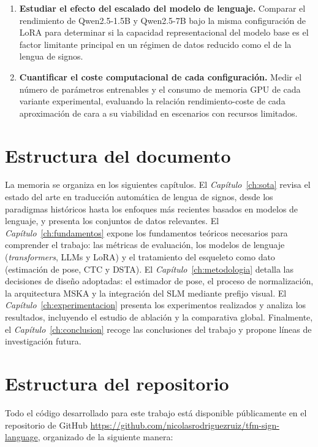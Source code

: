 \begin{enumerate}
    \item \textbf{Estudiar el efecto del escalado del modelo de lenguaje.}
    Comparar el rendimiento de Qwen2.5-1.5B y Qwen2.5-7B bajo la misma configuración de LoRA para determinar si la capacidad representacional del modelo base es el factor limitante principal en un régimen de datos reducido como el de la lengua de signos.

    \item \textbf{Cuantificar el coste computacional de cada configuración.}
    Medir el número de parámetros entrenables y el consumo de memoria GPU de cada variante experimental, evaluando la relación rendimiento-coste de cada aproximación de cara a su viabilidad en escenarios con recursos limitados.

\end{enumerate}

\section{Estructura del documento}

La memoria se organiza en los siguientes capítulos.
El \textit{Capítulo}~\ref{ch:sota} revisa el estado del arte en traducción automática de lengua de signos, desde los paradigmas históricos hasta los enfoques más recientes basados en modelos de lenguaje, y presenta los conjuntos de datos relevantes.
El \textit{Capítulo}~\ref{ch:fundamentos} expone los fundamentos teóricos necesarios para comprender el trabajo: las métricas de evaluación, los modelos de lenguaje (\textit{transformers}, LLMs y LoRA) y el tratamiento del esqueleto como dato (estimación de pose, CTC y DSTA).
El \textit{Capítulo}~\ref{ch:metodologia} detalla las decisiones de diseño adoptadas: el estimador de pose, el proceso de normalización, la arquitectura MSKA y la integración del SLM mediante prefijo visual.
El \textit{Capítulo}~\ref{ch:experimentacion} presenta los experimentos realizados y analiza los resultados, incluyendo el estudio de ablación y la comparativa global.
Finalmente, el \textit{Capítulo}~\ref{ch:conclusion} recoge las conclusiones del trabajo y propone líneas de investigación futura.

\section{Estructura del repositorio}
Todo el código desarrollado para este trabajo está disponible públicamente en el repositorio de GitHub \url{https://github.com/nicolasrodriguezruiz/tfm-sign-language}, organizado de la siguiente manera:

